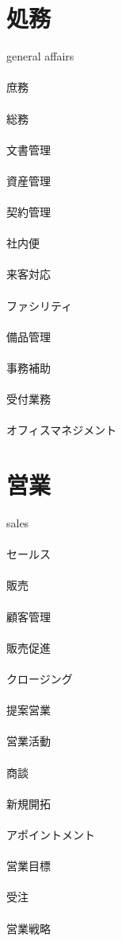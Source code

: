\clearpage
\section*{処務}
general affairs
\\\\
庶務
\\\\
総務
\\\\
文書管理
\\\\
資産管理
\\\\
契約管理
\\\\
社内便
\\\\
来客対応
\\\\
ファシリティ
\\\\
備品管理
\\\\
事務補助
\\\\
受付業務
\\\\
オフィスマネジメント

\clearpage
\section*{営業}
sales
\\\\
セールス
\\\\
販売
\\\\
顧客管理
\\\\
販売促進
\\\\
クロージング
\\\\
提案営業
\\\\
営業活動
\\\\
商談
\\\\
新規開拓
\\\\
アポイントメント
\\\\
営業目標
\\\\
受注
\\\\
営業戦略

